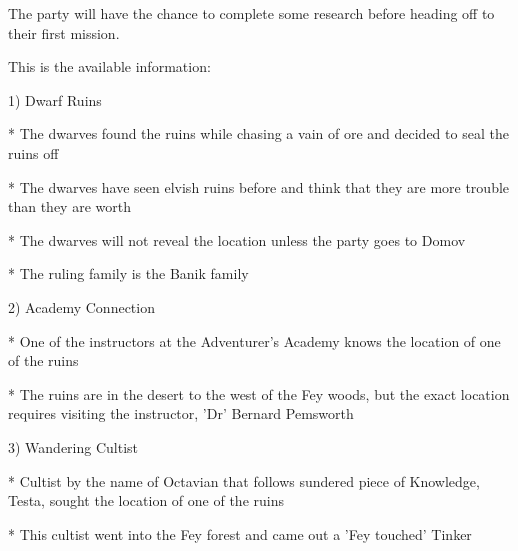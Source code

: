 The party will have the chance to complete some research before heading off to their first mission.

This is the available information:

1) Dwarf Ruins

* The dwarves found the ruins while chasing a vain of ore and decided to seal the ruins off

* The dwarves have seen elvish ruins before and think that they are more trouble than they are worth

* The dwarves will not reveal the location unless the party goes to Domov

* The ruling family is the Banik family

2) Academy Connection

* One of the instructors at the Adventurer's Academy knows the location of one of the ruins

* The ruins are in the desert to the west of the Fey woods, but the exact location requires visiting the instructor, 'Dr' Bernard Pemsworth

3) Wandering Cultist

* Cultist by the name of Octavian that follows sundered piece of Knowledge, Testa, sought the location of one of the ruins

* This cultist went into the Fey forest and came out a 'Fey touched' Tinker
